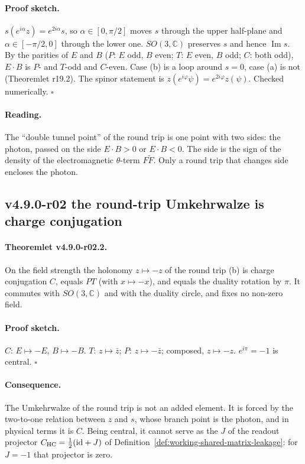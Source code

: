 \paragraph{Proof sketch.}
\(s(e^{i\alpha}z)=e^{2i\alpha}s\), so \(\alpha\in[0,\pi/2]\) moves \(s\) through the upper half-plane and
\(\alpha\in[-\pi/2,0]\) through the lower one.  \(SO(3,\mathbb C)\) preserves \(s\) and hence \(\operatorname{Im}s\).  By the
parities of \(E\) and \(B\) (\(P\): \(E\) odd, \(B\) even; \(T\): \(E\) even, \(B\) odd; \(C\): both odd), \(E\cdot B\) is
\(P\)- and \(T\)-odd and \(C\)-even.  Case (b) is a loop around \(s=0\), case (a) is not (Theoremlet r19.2).  The spinor
statement is \(z(e^{i\varphi}\psi)=e^{2i\varphi}z(\psi)\).  Checked numerically.  \(\square\)

\paragraph{Reading.}
The ``double tunnel point'' of the round trip is one point with two sides: the photon, passed on the side
\(E\cdot B>0\) or \(E\cdot B<0\).  The side is the sign of the density of the electromagnetic \(\theta\)-term
\(F\tilde F\).  Only a round trip that changes side encloses the photon.

\subsection*{v4.9.0-r02 the round-trip Umkehrwalze is charge conjugation}
\label{subsec:v490-r02-charge-conjugation}

\paragraph{Theoremlet v4.9.0-r02.2.}
On the field strength the holonomy \(z\mapsto-z\) of the round trip (b) is charge conjugation \(C\), equals \(PT\)
(with \(x\mapsto-x\)), and equals the duality rotation by \(\pi\).  It commutes with \(SO(3,\mathbb C)\) and with the duality
circle, and fixes no non-zero field.

\paragraph{Proof sketch.}
\(C\): \(E\mapsto-E\), \(B\mapsto-B\).  \(T\): \(z\mapsto\bar z\); \(P\): \(z\mapsto-\bar z\); composed, \(z\mapsto-z\).
\(e^{i\pi}=-1\) is central.  \(\square\)

\paragraph{Consequence.}
The Umkehrwalze of the round trip is not an added element.  It is forced by the two-to-one relation between \(z\) and
\(s\), whose branch point is the photon, and in physical terms it is \(C\).  Being central, it cannot serve as the \(J\) of
the readout projector \(C_{\mathrm{HC}}=\tfrac12(\mathrm{id}+J)\) of Definition~\ref{def:working-shared-matrix-leakage}: for
\(J=-1\) that projector is zero.

